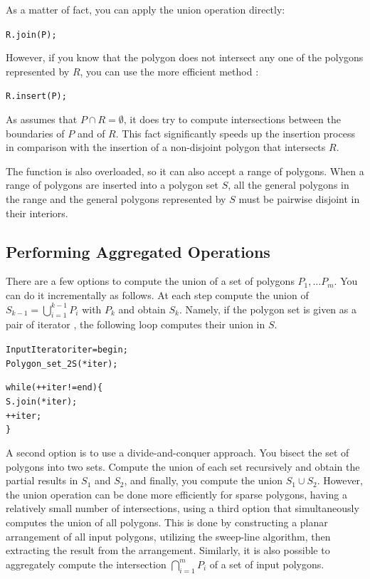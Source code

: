 As a matter of fact, you can apply the union operation directly:
\begin{alltt}
  R.join (P);
\end{alltt}

However, if you know that the polygon does not intersect any one of the
polygons represented by $R$, you can use the more efficient method
:
\begin{alltt}
  R.insert (P);
\end{alltt}

As  assumes that $P \cap R = \emptyset$, it does try to
compute intersections between the boundaries of $P$ and of $R$. This
fact significantly speeds up the insertion process in comparison with the
insertion of a non-disjoint polygon that intersects $R$.

The  function is also overloaded, so it can also accept a
range of polygons. When a range of polygons are inserted into a
polygon set $S$, all the general polygons in the range and the general
polygons represented by $S$ must be pairwise disjoint in their interiors.

\subsection{Performing Aggregated Operations}
\label{bops_ssec:agg_ops}

There are a few options to compute the union of a set of polygons
$P_1, \ldots P_m$. You can do it incrementally as follows. At each step
compute the union of $S_{k-1} = \bigcup_{i=1}^{k-1}{P_i}$ 
with $P_{k}$ and obtain $S_k$. Namely, if the polygon set is given
as a pair of iterator \ccc{[begin, end)}, the following loop computes
their union in $S$.
\begin{alltt}
  InputIterator iter = begin;
  Polygon_set_2 S (*iter);

  while (++iter != end) \{
    S.join (*iter);
    ++iter;
  \}
\end{alltt}  
A second option is to use a divide-and-conquer approach. You bisect
the set of polygons into two sets. Compute the union of each set
recursively and obtain the partial results in $S_1$ and $S_2$, and
finally, you compute the union $S_1 \cup S_2$. However, the union
operation can be done more efficiently for sparse polygons, having
a relatively small number of intersections, using a third option that
simultaneously computes the union of all polygons. This is done by 
constructing a planar arrangement of all input polygons, utilizing the
sweep-line algorithm, then extracting the result from the
arrangement. Similarly, it is also possible to aggregately compute the
intersection $\bigcap_{i=1}^{m}{P_i}$ of a set of input polygons.

